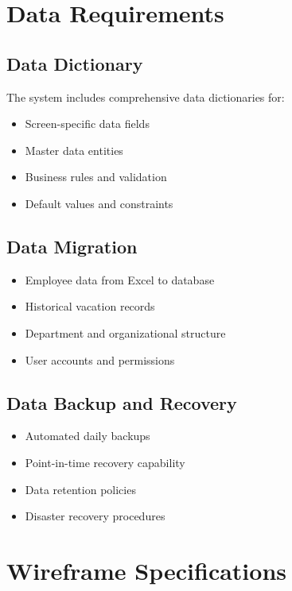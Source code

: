 \documentclass[12pt,a4paper]{article}
\begin{document}
\section{Data Requirements}

\subsection{Data Dictionary}
The system includes comprehensive data dictionaries for:
\begin{itemize}
    \item Screen-specific data fields
    \item Master data entities
    \item Business rules and validation
    \item Default values and constraints
\end{itemize}

\subsection{Data Migration}
\begin{itemize}
    \item Employee data from Excel to database
    \item Historical vacation records
    \item Department and organizational structure
    \item User accounts and permissions
\end{itemize}

\subsection{Data Backup and Recovery}
\begin{itemize}
    \item Automated daily backups
    \item Point-in-time recovery capability
    \item Data retention policies
    \item Disaster recovery procedures
\end{itemize}

\section{Wireframe Specifications}
\end{document}
